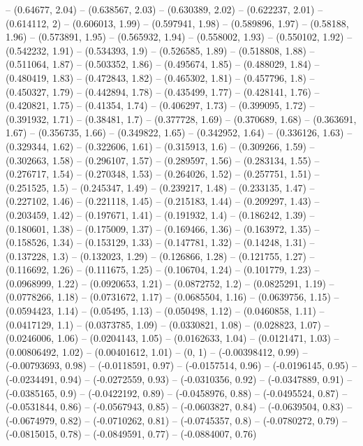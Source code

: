 -- (0.64677, 2.04)
-- (0.638567, 2.03)
-- (0.630389, 2.02)
-- (0.622237, 2.01)
-- (0.614112, 2)
-- (0.606013, 1.99)
-- (0.597941, 1.98)
-- (0.589896, 1.97)
-- (0.58188, 1.96)
-- (0.573891, 1.95)
-- (0.565932, 1.94)
-- (0.558002, 1.93)
-- (0.550102, 1.92)
-- (0.542232, 1.91)
-- (0.534393, 1.9)
-- (0.526585, 1.89)
-- (0.518808, 1.88)
-- (0.511064, 1.87)
-- (0.503352, 1.86)
-- (0.495674, 1.85)
-- (0.488029, 1.84)
-- (0.480419, 1.83)
-- (0.472843, 1.82)
-- (0.465302, 1.81)
-- (0.457796, 1.8)
-- (0.450327, 1.79)
-- (0.442894, 1.78)
-- (0.435499, 1.77)
-- (0.428141, 1.76)
-- (0.420821, 1.75)
-- (0.41354, 1.74)
-- (0.406297, 1.73)
-- (0.399095, 1.72)
-- (0.391932, 1.71)
-- (0.38481, 1.7)
-- (0.377728, 1.69)
-- (0.370689, 1.68)
-- (0.363691, 1.67)
-- (0.356735, 1.66)
-- (0.349822, 1.65)
-- (0.342952, 1.64)
-- (0.336126, 1.63)
-- (0.329344, 1.62)
-- (0.322606, 1.61)
-- (0.315913, 1.6)
-- (0.309266, 1.59)
-- (0.302663, 1.58)
-- (0.296107, 1.57)
-- (0.289597, 1.56)
-- (0.283134, 1.55)
-- (0.276717, 1.54)
-- (0.270348, 1.53)
-- (0.264026, 1.52)
-- (0.257751, 1.51)
-- (0.251525, 1.5)
-- (0.245347, 1.49)
-- (0.239217, 1.48)
-- (0.233135, 1.47)
-- (0.227102, 1.46)
-- (0.221118, 1.45)
-- (0.215183, 1.44)
-- (0.209297, 1.43)
-- (0.203459, 1.42)
-- (0.197671, 1.41)
-- (0.191932, 1.4)
-- (0.186242, 1.39)
-- (0.180601, 1.38)
-- (0.175009, 1.37)
-- (0.169466, 1.36)
-- (0.163972, 1.35)
-- (0.158526, 1.34)
-- (0.153129, 1.33)
-- (0.147781, 1.32)
-- (0.14248, 1.31)
-- (0.137228, 1.3)
-- (0.132023, 1.29)
-- (0.126866, 1.28)
-- (0.121755, 1.27)
-- (0.116692, 1.26)
-- (0.111675, 1.25)
-- (0.106704, 1.24)
-- (0.101779, 1.23)
-- (0.0968999, 1.22)
-- (0.0920653, 1.21)
-- (0.0872752, 1.2)
-- (0.0825291, 1.19)
-- (0.0778266, 1.18)
-- (0.0731672, 1.17)
-- (0.0685504, 1.16)
-- (0.0639756, 1.15)
-- (0.0594423, 1.14)
-- (0.05495, 1.13)
-- (0.050498, 1.12)
-- (0.0460858, 1.11)
-- (0.0417129, 1.1)
-- (0.0373785, 1.09)
-- (0.0330821, 1.08)
-- (0.028823, 1.07)
-- (0.0246006, 1.06)
-- (0.0204143, 1.05)
-- (0.0162633, 1.04)
-- (0.0121471, 1.03)
-- (0.00806492, 1.02)
-- (0.00401612, 1.01)
-- (0, 1)
-- (-0.00398412, 0.99)
-- (-0.00793693, 0.98)
-- (-0.0118591, 0.97)
-- (-0.0157514, 0.96)
-- (-0.0196145, 0.95)
-- (-0.0234491, 0.94)
-- (-0.0272559, 0.93)
-- (-0.0310356, 0.92)
-- (-0.0347889, 0.91)
-- (-0.0385165, 0.9)
-- (-0.0422192, 0.89)
-- (-0.0458976, 0.88)
-- (-0.0495524, 0.87)
-- (-0.0531844, 0.86)
-- (-0.0567943, 0.85)
-- (-0.0603827, 0.84)
-- (-0.0639504, 0.83)
-- (-0.0674979, 0.82)
-- (-0.0710262, 0.81)
-- (-0.0745357, 0.8)
-- (-0.0780272, 0.79)
-- (-0.0815015, 0.78)
-- (-0.0849591, 0.77)
-- (-0.0884007, 0.76)
